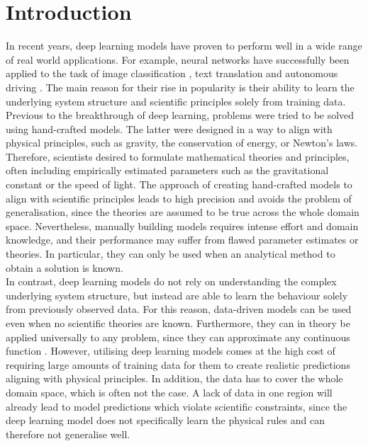 \label{section:introduction}
\section{Introduction}


In recent years, deep learning models have proven to perform well in a wide range of real world applications. For example, neural networks have successfully been applied to the task of image classification \cite{NIPS2012_4824}, text translation \cite{DBLP:journals/corr/ChoMBB14, DBLP:journals/corr/WuSCLNMKCGMKSJL16} and autonomous driving \cite{DBLP:journals/corr/HuvalWTKSPARMCM15, Sallab:2017:2470-1173:70}. The main reason for their rise in popularity is their ability to learn the underlying system structure and scientific principles solely from training data.\\
\indent Previous to the breakthrough of deep learning, problems were tried to be solved using hand-crafted models. The latter were designed in a way to align with physical principles, such as gravity, the conservation of energy, or Newton's laws. Therefore, scientists desired to formulate mathematical theories and principles, often including empirically estimated parameters such as the gravitational constant or the speed of light. The approach of creating hand-crafted models to align with scientific principles leads to high precision and avoids the problem of generalisation, since the theories are assumed to be true across the whole domain space. Nevertheless, manually building models requires intense effort and domain knowledge, and their performance may suffer from flawed parameter estimates or theories. In particular, they can only be used when an analytical method to obtain a solution is known. \\
\indent In contrast, deep learning models do not rely on understanding the complex underlying system structure, but instead are able to learn the behaviour solely from previously observed data. For this reason, data-driven models can be used even when no scientific theories are known. Furthermore, they can in theory be applied universally to any problem, since they can approximate any continuous function \cite{Cybenko1989}. However, utilising deep learning models comes at the high cost of requiring large amounts of training data for them to create realistic predictions aligning with physical principles. In addition, the data has to cover the whole domain space, which is often not the case. A lack of data in one region will already lead to model predictions which violate scientific constraints, since the deep learning model does not specifically learn the physical rules and can therefore not generalise well.\\
